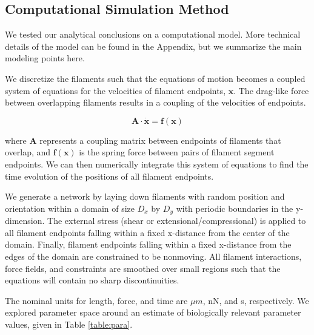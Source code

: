 \documentclass[10pt,letterpaper]{article}
\begin{document}
\subsection*{Computational Simulation Method}

We tested our analytical conclusions on a computational model.  More technical details of the model can be found in the Appendix, but we summarize the main modeling points here.

We discretize the filaments such that the equations of motion becomes a coupled system of equations for the velocities of filament endpoints, $\mathbf{x}$.  The drag-like force between overlapping filaments results in a coupling of the velocities of endpoints.  

\begin{equation}
\mathbf{A \cdot \dot x} = \mathbf{f(x)}
\end{equation}

where $\mathbf{A }$ represents a coupling matrix between endpoints of filaments that overlap, and $\mathbf{f(x)}$ is the spring force between pairs of filament segment endpoints.  We can then numerically integrate this system of equations to find the time evolution of the positions of all filament endpoints.

We generate a network by laying down filaments with random position and orientation within a domain of size $D_x$ by $D_y$ with periodic boundaries in the y-dimension.  The external stress (shear or extensional/compressional) is applied to all filament endpoints falling within a fixed x-distance from the center of the domain.  Finally, filament endpoints falling within a fixed x-distance from the edges of the domain are constrained to be nonmoving.  All filament interactions, force fields, and constraints are smoothed over small regions such that the equations will contain no sharp discontinuities.


The nominal units for length, force, and time are $\mu m$, nN, and s, respectively.  We explored parameter space around an estimate of biologically relevant parameter values, given in Table \ref{table:para}. 
\end{document}
